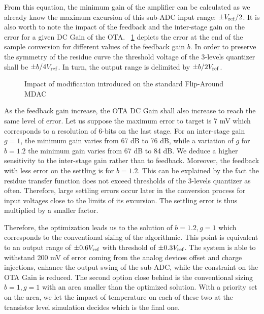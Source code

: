 From this equation, the minimum gain of the amplifier can be calculated as we already know the maximum excursion of this sub-ADC input range: \(\pm V_{\rm ref}/2\). It is also worth to note the impact of the feedback and the inter-stage gain on the error for a given DC Gain of the OTA\@. \figurename~\ref{fig:algo-cb-impact} depicts the error at the end of the sample conversion for different values of the feedback gain \(b\). In order to preserve the symmetry of the residue curve the threshold voltage of the 3-levels quantizer shall be \(\pm b/4 V_{\rm ref}\). In turn, the output range is delimited by \(\pm b/2 V_{\rm ref}\).

\begin{figure}[htp]
	\centering
	\begin{subfigure}[b]{0.45\textwidth}
		\centering
		\resizebox{\textwidth}{!}{
			
		}
		\label{fig:algo-cb-impact}
	\end{subfigure}
	\begin{subfigure}[b]{0.45\textwidth}
		\centering
		\resizebox{\textwidth}{!}{
			
		}
		\label{fig:algo-cg-impact}
	\end{subfigure}
	\caption{Impact of modification introduced on the standard Flip-Around MDAC}
	\label{fig:algo-error-cb-cg}
\end{figure}

As the feedback gain increase, the OTA DC Gain shall also increase to reach the same level of error. Let us suppose the maximum error to target is 7 mV which corresponds to a resolution of 6-bits on the last stage. For an inter-stage gain \(g = 1\), the minimum gain varies from 67 dB to 76 dB, while a variation of \(g\) for \(b = 1.2\) the minimum gain varies from 67 dB to 84 dB. We deduce a higher sensitivity to the inter-stage gain rather than to feedback. Moreover, the feedback with less error on the settling is for \(b = 1.2\). This can be explained by the fact the residue transfer function does not exceed thresholds of the 3-levels quantizer as often. Therefore, large settling errors occur later in the conversion process for input voltages close to the limits of its excursion. The settling error is thus multiplied by a smaller factor.

Therefore, the optimization leads us to the solution of \(b = 1.2, g = 1\) which corresponds to the conventional sizing of the algorithmic. This point is equivalent to an output range of \(\pm 0.6 V_{\rm ref}\) with threshold of \(\pm 0.3 V_{\rm ref}\). The system is able to withstand 200 mV of error coming from the analog devices offset and charge injections, enhance the output swing of the sub-ADC, while the constraint on the OTA Gain is reduced. The second option close behind is the conventional sizing \(b = 1, g = 1\) with an area smaller than the optimized solution. With a priority set on the area, we let the impact of temperature on each of these two at the transistor level simulation decides which is the final one.

